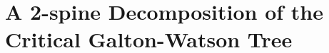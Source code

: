 \documentclass[UTF8]{pkuthss}
\theoremstyle{plain}
\newtheorem{thm}{Theorem}[section]
\theoremstyle{definition}
\numberwithin{equation}{section}
\begin{document}
\chapter{A 2-spine Decomposition of the Critical Galton-Watson Tree}
\begin{comment}
\section{Introduction}
\subsection{Model}
\label{sec:model}
Consider a critical Galton-Watson process
$(Z_n)_{n\ge 0}$ 	with $Z_0 = 1$
and offspring distribution $\mu$ on $\mathbb N_0 : = \{0,1,\dots\}$ which has mean $1$ and finite variance $\sigma^2>0$, i.e.,
\begin{equation}\label{eq:mean}
\sum_{k=0}^\infty k \mu(k)	=1
\end{equation}
and
\begin{equation}\label{eq:variance}
0	
<	\sigma^2
:=	\sum_{k=0}^\infty  (k-1)^2 \mu(k)
=	\sum_{k=0}^\infty k(k-1) \mu(k)
<	\infty.
\end{equation}
For simplicity,
we will refer to $(Z_n)_{n\geq 0}$ as a  \emph{$\mu$-Galton-Watson process}.
It is well known that
\begin{thm}[\cite{KestenNeySpitzer1966The-Galton-Watson}] 
\label{thm: Kolmogorov and Yaglom theorem}
	For a $\mu$-Galton-Watson process $(Z_n)_{n\geq 0}$
	satisfying \eqref{eq:mean} and \eqref{eq:variance}, we have
	\begin{enumerate}
		\item \label{thm:Kolmogorov}
		$n P (Z_n>0) \xrightarrow[n \to \infty]{} 2/\sigma^2;$
		\item \label{thm:Yaglom}
		$\{n^{-1}Z_n; P(\cdot | Z_n>0)\}\xrightarrow[n \to \infty]{d} Y,$
	\end{enumerate}
	where $Y$ is an exponential random variable with mean $\sigma^2/2$.
\end{thm}

Under a third moment assumption, assertions \eqref{thm:Kolmogorov} and \eqref{thm:Yaglom} of Theorem \ref{thm: Kolmogorov and Yaglom theorem} are due to \cite{Kolmogorov1938Zur-losung} and \cite{Yaglom1947Certain} respectively.
Theorem \ref{thm: Kolmogorov and Yaglom theorem}(2) is usually called Yaglom's theorem.
For probabilistic proofs of the above results, we refer our readers to
\cite{Geiger1999Elementary}, \cite{Geiger2000A-new} and \cite{LyonsPemantlePeres1995Conceptual}.


\end{comment}
\end{document}
